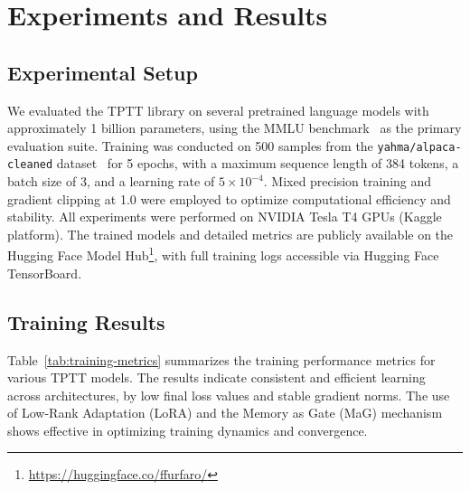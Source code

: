 \documentclass[10pt,a4paper]{article}
\begin{document}
\section{Experiments and Results}

\subsection{Experimental Setup}

We evaluated the TPTT library on several pretrained language models with approximately 1 billion parameters, using the MMLU benchmark~\cite{hendrycks2020measuring} as the primary evaluation suite. Training was conducted on 500 samples from the \texttt{yahma/alpaca-cleaned} dataset~\cite{taori2023alpaca} for 5 epochs, with a maximum sequence length of 384 tokens, a batch size of 3, and a learning rate of $5 \times 10^{-4}$. Mixed precision training and gradient clipping at 1.0 were employed to optimize computational efficiency and stability. All experiments were performed on NVIDIA Tesla T4 GPUs (Kaggle platform). The trained models and detailed metrics are publicly available on the Hugging Face Model Hub\footnote{\url{https://huggingface.co/ffurfaro/}}, with full training logs accessible via Hugging Face TensorBoard.

\subsection{Training Results}

Table~\ref{tab:training-metrics} summarizes the training performance metrics for various TPTT models. The results indicate consistent and efficient learning across architectures, by low final loss values and stable gradient norms. The use of Low-Rank Adaptation (LoRA) and the Memory as Gate (MaG) mechanism shows effective in optimizing training dynamics and convergence.

\begin{table}[h!]
    \centering
    \caption{Training performance metrics for TPTT models.}
    \label{tab:training-metrics}
\end{table}
\end{document}
